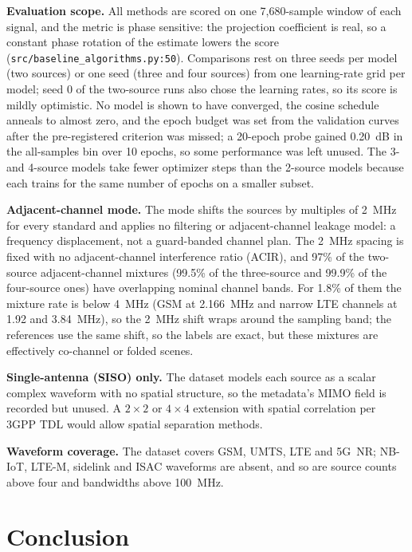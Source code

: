 \documentclass[journal]{IEEEtran}
\begin{document}
\textbf{Evaluation scope.} All methods are scored on one 7,680-sample window of
each signal, and the metric is phase sensitive: the projection coefficient is
real, so a constant phase rotation of the estimate lowers the score
(\texttt{src/baseline\_algorithms.py:50}). Comparisons rest on three seeds per
model (two sources) or one seed (three and four sources) from one learning-rate
grid per model; seed 0 of the two-source runs also chose the learning rates, so
its score is mildly optimistic. No model is shown to have converged, the cosine
schedule anneals to almost zero, and the epoch budget was set from the validation
curves after the pre-registered criterion was missed; a 20-epoch probe gained
0.20~dB in the all-samples bin over 10 epochs, so some performance was left
unused. The 3- and 4-source models take fewer optimizer steps than the 2-source
models because each trains for the same number of epochs on a smaller subset.

\textbf{Adjacent-channel mode.} The mode shifts the sources by multiples of 2~MHz for
every standard and applies no filtering or adjacent-channel leakage model: a
frequency displacement, not a guard-banded channel plan. The 2~MHz spacing is fixed
with no adjacent-channel interference ratio (ACIR), and 97\% of the two-source
adjacent-channel mixtures (99.5\% of the three-source and 99.9\% of the four-source
ones) have overlapping nominal channel bands. For 1.8\% of them the mixture rate is
below 4~MHz (GSM at 2.166~MHz and narrow LTE channels at 1.92 and 3.84~MHz), so the
2~MHz shift wraps around the sampling band; the references use the same shift, so
the labels are exact, but these mixtures are effectively co-channel or folded
scenes.

\textbf{Single-antenna (SISO) only.} The dataset models each source as a scalar
complex waveform with no spatial structure, so the metadata's MIMO field is
recorded but unused. A $2\times2$ or $4\times4$ extension with spatial correlation
per 3GPP TDL would allow spatial separation methods.

\textbf{Waveform coverage.} The dataset covers GSM, UMTS, LTE and 5G~NR;
NB-IoT, LTE-M, sidelink and ISAC waveforms are absent, and so are source counts
above four and bandwidths above 100~MHz.

\section{Conclusion}
\label{sec:conclusion}
\end{document}
